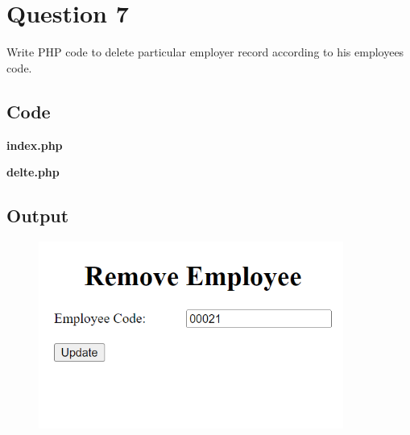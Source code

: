 \documentclass{article}
\begin{document}
\section*{Question 7}
Write PHP code to delete particular employer record according to his employees code.
\subsection*{Code}
\textbf{index.php}

\textbf{delte.php}

\newpage
\subsection*{Output}
\begin{figure}[H]
  \centering
  \includegraphics[width=10cm]{7/out.png}
\end{figure}
\end{document}
